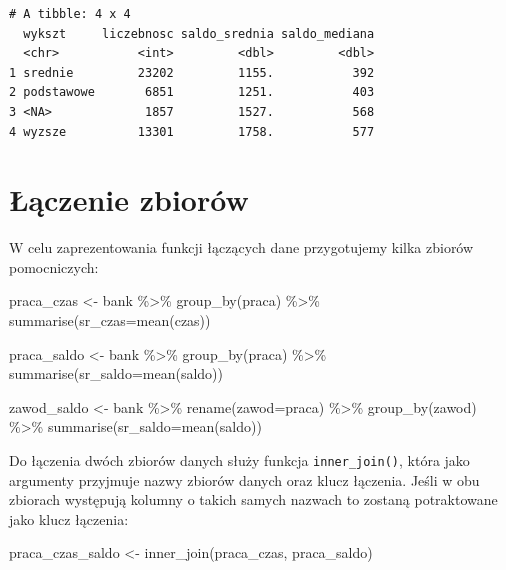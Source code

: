 \documentclass[
  letterpaper,
  DIV=11,
  numbers=noendperiod]{scrreprt}
\newenvironment{Shaded}{\begin{snugshade}}{\end{snugshade}}
\newcommand{\AttributeTok}[1]{\textcolor[rgb]{0.40,0.45,0.13}{#1}}
\newcommand{\FunctionTok}[1]{\textcolor[rgb]{0.28,0.35,0.67}{#1}}
\newcommand{\NormalTok}[1]{\textcolor[rgb]{0.00,0.23,0.31}{#1}}
\newcommand{\OtherTok}[1]{\textcolor[rgb]{0.00,0.23,0.31}{#1}}
\newcommand{\SpecialCharTok}[1]{\textcolor[rgb]{0.37,0.37,0.37}{#1}}
\begin{document}
\begin{verbatim}
# A tibble: 4 x 4
  wykszt     liczebnosc saldo_srednia saldo_mediana
  <chr>           <int>         <dbl>         <dbl>
1 srednie         23202         1155.           392
2 podstawowe       6851         1251.           403
3 <NA>             1857         1527.           568
4 wyzsze          13301         1758.           577
\end{verbatim}

\hypertarget{ux142ux105czenie-zbioruxf3w}{%
\section{Łączenie zbiorów}\label{ux142ux105czenie-zbioruxf3w}}

W celu zaprezentowania funkcji łączących dane przygotujemy kilka zbiorów
pomocniczych:

\begin{Shaded}
\begin{Highlighting}[]
\NormalTok{praca\_czas }\OtherTok{\textless{}{-}}\NormalTok{ bank }\SpecialCharTok{\%\textgreater{}\%}
  \FunctionTok{group\_by}\NormalTok{(praca) }\SpecialCharTok{\%\textgreater{}\%}
  \FunctionTok{summarise}\NormalTok{(}\AttributeTok{sr\_czas=}\FunctionTok{mean}\NormalTok{(czas))}

\NormalTok{praca\_saldo }\OtherTok{\textless{}{-}}\NormalTok{ bank }\SpecialCharTok{\%\textgreater{}\%}
  \FunctionTok{group\_by}\NormalTok{(praca) }\SpecialCharTok{\%\textgreater{}\%}
  \FunctionTok{summarise}\NormalTok{(}\AttributeTok{sr\_saldo=}\FunctionTok{mean}\NormalTok{(saldo))}

\NormalTok{zawod\_saldo }\OtherTok{\textless{}{-}}\NormalTok{ bank }\SpecialCharTok{\%\textgreater{}\%}
  \FunctionTok{rename}\NormalTok{(}\AttributeTok{zawod=}\NormalTok{praca) }\SpecialCharTok{\%\textgreater{}\%}
  \FunctionTok{group\_by}\NormalTok{(zawod) }\SpecialCharTok{\%\textgreater{}\%}
  \FunctionTok{summarise}\NormalTok{(}\AttributeTok{sr\_saldo=}\FunctionTok{mean}\NormalTok{(saldo))}
\end{Highlighting}
\end{Shaded}

Do łączenia dwóch zbiorów danych służy funkcja \texttt{inner\_join()},
która jako argumenty przyjmuje nazwy zbiorów danych oraz klucz łączenia.
Jeśli w obu zbiorach występują kolumny o takich samych nazwach to
zostaną potraktowane jako klucz łączenia:

\begin{Shaded}
\begin{Highlighting}[]
\NormalTok{praca\_czas\_saldo }\OtherTok{\textless{}{-}} \FunctionTok{inner\_join}\NormalTok{(praca\_czas, praca\_saldo)}
\end{Highlighting}
\end{Shaded}
\end{document}
